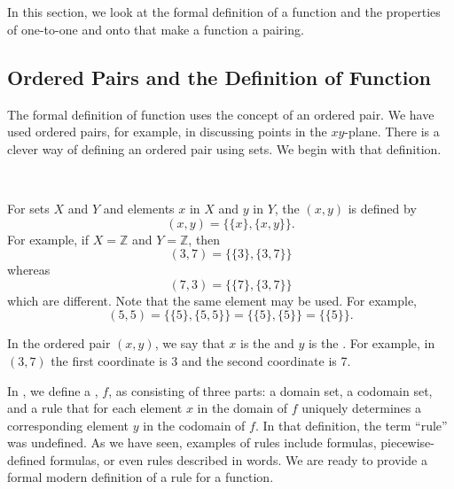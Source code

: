 \section{\seconetooneonto}
\label{sec_onetoone_onto_fns}

In this section, we look at the formal definition of a function and the properties of one-to-one and onto that make a function a pairing.

\newcommand{\suborderedpair}{Ordered Pairs and the Definition of Function}
\subsection{\suborderedpair}
\label{sub_ordered pairs}

The formal definition of function uses the concept of an ordered pair.  We have used ordered pairs, for example, in discussing points in the $xy$-plane.  There is a clever way of defining an ordered pair using sets. We begin with that definition.

\begin{defn}
\label{defn_ordered_pairs}
~
    \begin{apart}
        \item For sets $X$ and  $Y$ and elements $x$ in $X$ and $y$ in $Y$, the  $(x,y)$ is defined by $$(x,y) = \{\{x\}, \{x,y\}\}.$$  For example, if $X = \mathbb{Z}$ and $Y = \mathbb{Z}$, then
        $$(3,7) = \{\{3\}, \{3,7\}\}$$ whereas $$(7,3) = \{\{7\}, \{3,7\}\}$$
        which are different.  Note that the same element may be used.  For example, 
        $$(5,5) = \{\{5\}, \{5,5\}\}=\{\{5\},\{5\}\}=\{\{5\}\}. $$
        
        \item In the ordered pair $(x,y)$, we say that $x$ is the  and $y$ is the .  For example, in $(3,7)$ the first coordinate is 3 and the second coordinate is 7.
    \end{apart}  
\end{defn}

In , we define a , $f$, as consisting of three parts: a domain set, a codomain set, and a rule that for each element $x$ in the domain of $f$ uniquely determines a corresponding element $y$ in the codomain of $f$.  In that definition, the term ``rule'' was undefined.  As we have seen, examples of rules include formulas, piecewise-defined formulas, or even rules described in words.  We are ready to provide a formal modern definition of a rule for a function.

